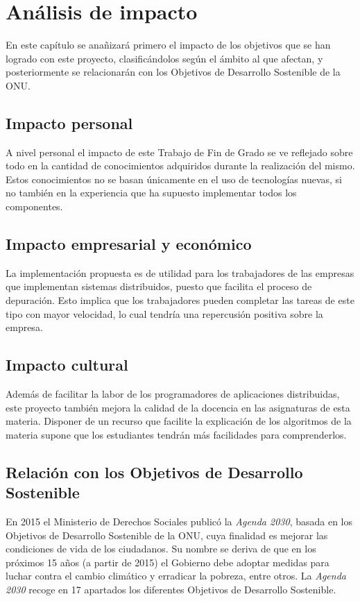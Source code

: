 \chapter{Análisis de impacto}

En este capítulo se anañizará primero el impacto de los objetivos que se han logrado con este proyecto, clasificándolos según el ámbito al que afectan, y posteriormente se relacionarán con los Objetivos de Desarrollo Sostenible de la ONU.

\section{Impacto personal}

A nivel personal el impacto de este Trabajo de Fin de Grado se ve reflejado sobre todo en la cantidad de conocimientos adquiridos durante la realización del mismo. Estos conocimientos no se basan únicamente en el uso de tecnologías nuevas, si no también en la experiencia que ha supuesto implementar todos los componentes.

\section{Impacto empresarial y económico}

La implementación propuesta es de utilidad para los trabajadores de las empresas que implementan sistemas distribuidos, puesto que facilita el proceso de depuración. Esto implica que los trabajadores pueden completar las tareas de este tipo con mayor velocidad, lo cual tendría una repercusión positiva sobre la empresa.

\section{Impacto cultural}
Además de facilitar la labor de los programadores de aplicaciones distribuidas, este proyecto también mejora la calidad de la docencia en las asignaturas de esta materia. Disponer de un recurso que facilite la explicación de los algoritmos de la materia supone que los estudiantes tendrán más facilidades para comprenderlos.

\section{Relación con los Objetivos de Desarrollo Sostenible}

En 2015 el Ministerio de Derechos Sociales publicó la \textit{Agenda 2030}\cite{agenda2030}, basada en los Objetivos de Desarrollo Sostenible\cite{ods} de la ONU, cuya finalidad es mejorar las condiciones de vida de los ciudadanos. Su nombre se deriva de que en los próximos 15 años (a partir de 2015) el Gobierno debe adoptar medidas para luchar contra el cambio climático y erradicar la pobreza, entre otros. La \textit{Agenda 2030} recoge en 17 apartados los diferentes Objetivos de Desarrollo Sostenible. 

